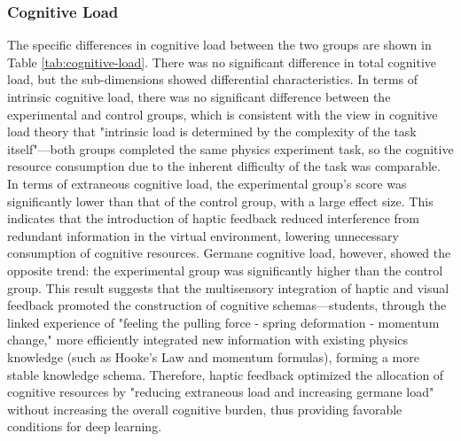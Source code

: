 \documentclass[runningheads]{llncs}
\begin{document}
\subsubsection{Cognitive Load}
The specific differences in cognitive load between the two groups are shown in Table \ref{tab:cognitive-load}. There was no significant difference in total cognitive load, but the sub-dimensions showed differential characteristics. In terms of intrinsic cognitive load, there was no significant difference between the experimental and control groups, which is consistent with the view in cognitive load theory that "intrinsic load is determined by the complexity of the task itself"—both groups completed the same physics experiment task, so the cognitive resource consumption due to the inherent difficulty of the task was comparable. In terms of extraneous cognitive load, the experimental group's score was significantly lower than that of the control group, with a large effect size. This indicates that the introduction of haptic feedback reduced interference from redundant information in the virtual environment, lowering unnecessary consumption of cognitive resources. Germane cognitive load, however, showed the opposite trend: the experimental group was significantly higher than the control group. This result suggests that the multisensory integration of haptic and visual feedback promoted the construction of cognitive schemas—students, through the linked experience of "feeling the pulling force - spring deformation - momentum change," more efficiently integrated new information with existing physics knowledge (such as Hooke's Law and momentum formulas), forming a more stable knowledge schema. Therefore, haptic feedback optimized the allocation of cognitive resources by "reducing extraneous load and increasing germane load" without increasing the overall cognitive burden, thus providing favorable conditions for deep learning.
\end{document}
